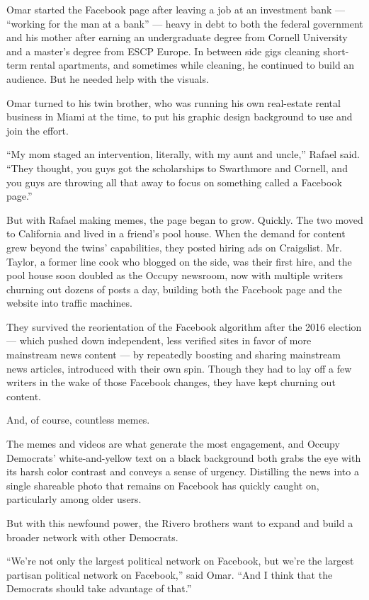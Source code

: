 Omar started the Facebook page after leaving a job at an investment bank
--- ``working for the man at a bank'' --- heavy in debt to both the
federal government and his mother after earning an undergraduate degree
from Cornell University and a master's degree from ESCP Europe. In
between side gigs cleaning short-term rental apartments, and sometimes
while cleaning, he continued to build an audience. But he needed help
with the visuals.

Omar turned to his twin brother, who was running his own real-estate
rental business in Miami at the time, to put his graphic design
background to use and join the effort.

``My mom staged an intervention, literally, with my aunt and uncle,''
Rafael said. ``They thought, you guys got the scholarships to Swarthmore
and Cornell, and you guys are throwing all that away to focus on
something called a Facebook page.''

But with Rafael making memes, the page began to grow. Quickly. The two
moved to California and lived in a friend's pool house. When the demand
for content grew beyond the twins' capabilities, they posted hiring ads
on Craigslist. Mr. Taylor, a former line cook who blogged on the side,
was their first hire, and the pool house soon doubled as the Occupy
newsroom, now with multiple writers churning out dozens of posts a day,
building both the Facebook page and the website into traffic machines.

They survived the reorientation of the Facebook algorithm after the 2016
election --- which pushed down independent, less verified sites in favor
of more mainstream news content --- by repeatedly boosting and sharing
mainstream news articles, introduced with their own spin. Though they
had to lay off a few writers in the wake of those Facebook changes, they
have kept churning out content.

And, of course, countless memes.

The memes and videos are what generate the most engagement, and Occupy
Democrats' white-and-yellow text on a black background both grabs the
eye with its harsh color contrast and conveys a sense of urgency.
Distilling the news into a single shareable photo that remains on
Facebook has quickly caught on, particularly among older users.

But with this newfound power, the Rivero brothers want to expand and
build a broader network with other Democrats.

``We're not only the largest political network on Facebook, but we're
the largest partisan political network on Facebook,'' said Omar. ``And I
think that the Democrats should take advantage of that.''

